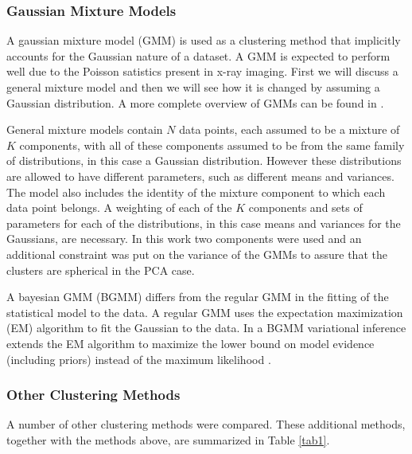 \documentclass[a4paper,11pt]{article}
\begin{document}
\subsubsection{Gaussian Mixture Models}

A gaussian mixture model (GMM) is used as a clustering method that implicitly accounts for the Gaussian nature of a dataset. A GMM is expected to perform well due to the Poisson satistics present in x-ray imaging. First we will discuss a general mixture model and then we will see how it is changed by assuming a Gaussian distribution. A more complete overview of GMMs can be found in \cite{DinovExpectationTutorial}.

General mixture models contain $N$ data points, each assumed to be a mixture of $K$ components, with all of these components assumed to be from the same family of distributions, in this case a Gaussian distribution. However these distributions are allowed to have different parameters, such as different means and variances. The model also includes the identity of the mixture component to which each data point belongs. A weighting of each of the $K$ components and sets of parameters for each of the distributions, in this case means and variances for the Gaussians, are necessary. In this work two components were used and an additional constraint was put on the variance of the GMMs to assure that the clusters are spherical in the PCA case.

A bayesian GMM (BGMM) differs from the regular GMM in the fitting of the statistical model to the data. A regular GMM uses the expectation maximization (EM) algorithm to fit the Gaussian to the data. In a BGMM variational inference extends the EM algorithm to maximize the lower bound on model evidence (including priors) instead of the maximum likelihood \cite{Blei2006VariationalMixtures}.

\subsubsection{Other Clustering Methods}

A number of other clustering methods were compared. These additional methods, together with the methods above, are summarized in Table \ref{tab1}.
\end{document}
